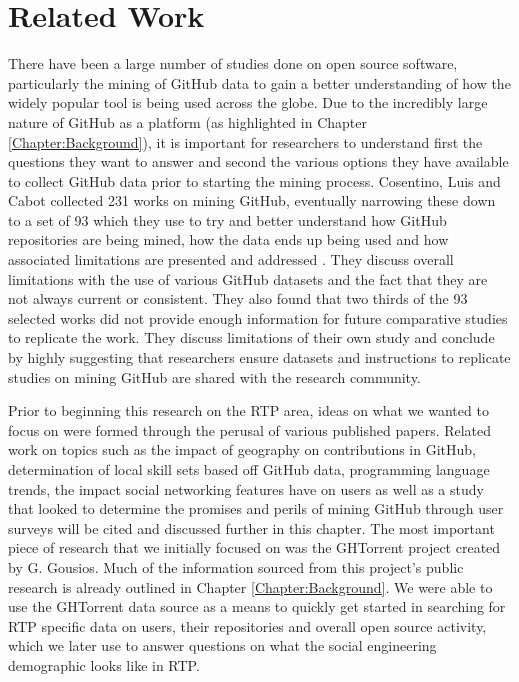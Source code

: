 \chapter{Related Work}
\label{Chapter:RelatedWork}

There have been a large number of studies done on open source software, particularly the mining of GitHub data to gain a better understanding of how the widely popular tool is being used across the globe. Due to the incredibly large nature of GitHub as a platform (as highlighted in Chapter \ref{Chapter:Background}), it is important for researchers to understand first the questions they want to answer and second the various options they have available to collect GitHub data prior to starting the mining process. Cosentino, Luis and Cabot collected 231 works on mining GitHub, eventually narrowing these down to a set of 93 which they use to try and better understand how GitHub repositories are being mined, how the data ends up being used and how associated limitations are presented and addressed \cite{cabot_should_2016}. They discuss overall limitations with the use of various GitHub datasets and the fact that they are not always current or consistent. They also found that two thirds of the 93 selected works did not provide enough information for future comparative studies to replicate the work. They discuss limitations of their own study and conclude by highly suggesting that researchers ensure datasets and instructions to replicate studies on mining GitHub are shared with the research community. 

Prior to beginning this research on the RTP area, ideas on what we wanted to focus on were formed through the perusal of various published papers. Related work on topics such as the impact of geography on contributions in GitHub, determination of local skill sets based off GitHub data, programming language trends, the impact social networking features have on users as well as a study that looked to determine the promises and perils of mining GitHub through user surveys will be cited and discussed further in this chapter. The most important piece of research that we initially focused on was the GHTorrent project created by G. Gousios. Much of the information sourced from this project's public research is already outlined in Chapter \ref{Chapter:Background}. We were able to use the GHTorrent data source as a means to quickly get started in searching for RTP specific data on users, their repositories and overall open source activity, which we later use to answer questions on what the social engineering demographic looks like in RTP.


